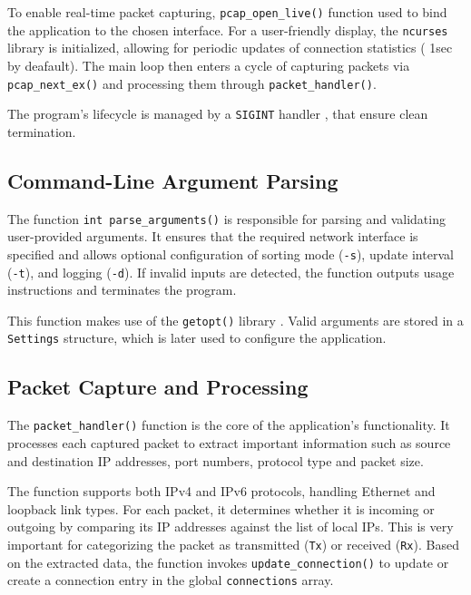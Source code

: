 \documentclass[12pt]{extarticle}
\begin{document}
To enable real-time packet capturing, \texttt{pcap\_open\_live()} \cite{libpcap} function used to bind the application to the chosen interface. For a user-friendly display, the \texttt{ncurses} library \cite{ncurses} is initialized, allowing for periodic updates of connection statistics ( 1sec by deafault). The main loop then enters a cycle of capturing packets via \texttt{pcap\_next\_ex()} \cite{libpcap} and processing them through \texttt{packet\_handler()}.

The program's lifecycle is managed by a \texttt{SIGINT} handler \cite{linuxman}, that ensure clean termination. 

\subsection{Command-Line Argument Parsing}

The function \texttt{int parse\_arguments()} is responsible for parsing and validating user-provided arguments. It ensures that the required network interface is specified and allows optional configuration of sorting mode (\texttt{-s}), update interval (\texttt{-t}), and logging (\texttt{-d}). If invalid inputs are detected, the function outputs usage instructions and terminates the program.

This function makes use of the \texttt{getopt()} library \cite{linuxman}. Valid arguments are stored in a \texttt{Settings} structure, which is later used to configure the application.

\subsection{Packet Capture and Processing}

The \texttt{packet\_handler()} function is the core of the application's functionality. It processes each captured packet to extract important information such as source and destination IP addresses, port numbers, protocol type and packet size.

The function supports both IPv4 and IPv6 protocols, handling Ethernet and loopback link types. For each packet, it determines whether it is incoming or outgoing by comparing its IP addresses against the list of local IPs. This is very important for categorizing the packet as transmitted (\texttt{Tx}) or received (\texttt{Rx}). Based on the extracted data, the function invokes \texttt{update\_connection()} to update or create a connection entry in the global \texttt{connections} array. 
\end{document}
